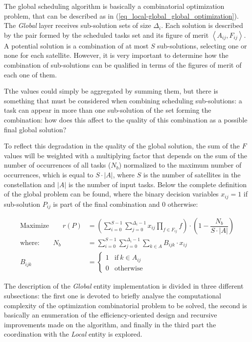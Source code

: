 The global scheduling algorithm is basically a combinatorial optimization problem, that can be described as in (\ref{eq_local-global_global_optimization}). The \emph{Global} layer receives sub-solution sets of size $\Delta_i$. Each solution is described by the pair formed by the scheduled tasks set and its figure of merit $\left\langle A_{ij}, F_{ij}\right\rangle$. A potential solution is a combination of at most $S$ sub-solutions, selecting one or none for each satellite. However, it is very important to determine how the combination of sub-solutions can be qualified in terms of the figures of merit of each one of them.

Tthe values could simply be aggregated by summing them, but there is something that must be considered when combining scheduling sub-solutions: a task can appear in more than one sub-solution of the set forming the combination: how does this affect to the quality of this combination as a possible final global solution?

To reflect this degradation in the quality of the global solution, the sum of the $F$ values will be weighted with a multiplying factor that depends on the sum of the number of occurrences of all tasks ($N_b$) normalized to the maximum number of occurrences, which is equal to $S\cdot |A|$, where $S$ is the number of satellites in the constellation and $|A|$ is the number of input tasks. Below the complete definition of the global problem can be found, where the binary decision variables $x_{ij}=1$ if sub-solution $P_{ij}$ is part of the final combination and $0$ otherwise: 

\begin{subequations}
\label{eq_local-global_global_optimization}
\begin{align}
\text{Maximize} \qquad r(P) &= \left(\sum_{i=0}^{S-1}\sum_{j=0}^{\Delta_i-1}x_{ij}{\prod_{f \in F_{ij}}f}\right)\cdot\left(1-\dfrac{N_b}{S\cdot |A|}\right)\\
\text{where:} \qquad N_b &= \sum_{i=0}^{S-1}\sum_{j=0}^{\Delta_i-1}\sum_{k \in A}{B_{ijk}\cdot x_{ij}}\\
B_{ijk} &= \begin{cases}1 & \text{if} ~k \in A_{ij}\\ 0 & \text{otherwise}\end{cases}
\end{align}
\end{subequations}

The description of the \emph{Global} entity implementation is divided in three different subsections: the first one is devoted to briefly analyse the computational complexity of the optimization combinatorial problem to be solved, the second is basically an enumeration of the efficiency-oriented design and recursive improvements made on the algorithm, and finally in the third part the coordination with the \emph{Local} entity is explored. 

